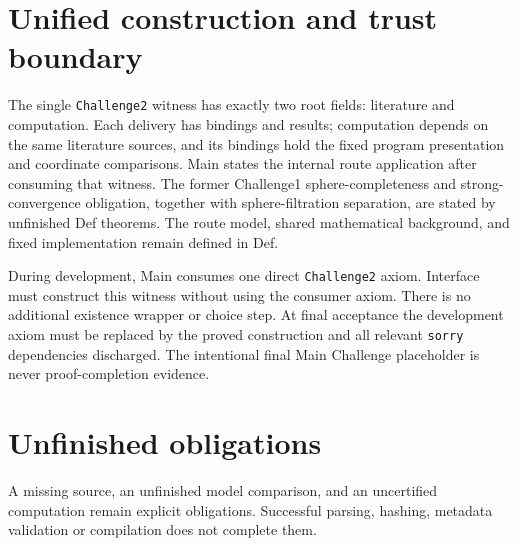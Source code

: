 \section{Unified construction and trust boundary}
\label{def:kip126-trust-boundary}

The single \texttt{Challenge2} witness has exactly two root fields: literature
and computation. Each delivery has bindings and results; computation depends
on the same literature sources, and its bindings hold the fixed program
presentation and coordinate comparisons. Main states the internal route
application after consuming that witness. The former Challenge1
sphere-completeness and strong-convergence obligation, together with
sphere-filtration separation, are stated by unfinished Def theorems.
The route model, shared mathematical background, and fixed implementation
remain defined in Def.

During development, Main consumes one direct \texttt{Challenge2} axiom.
Interface must construct this witness without using the consumer axiom.
There is no additional existence wrapper or choice step. At final acceptance
the development axiom must be replaced by the proved construction and all
relevant \texttt{sorry} dependencies discharged. The intentional final Main
Challenge placeholder is never proof-completion evidence.

\section{Unfinished obligations}

A missing source, an unfinished model comparison, and an uncertified
computation remain explicit obligations.
Successful parsing, hashing, metadata validation or compilation does not
complete them.
